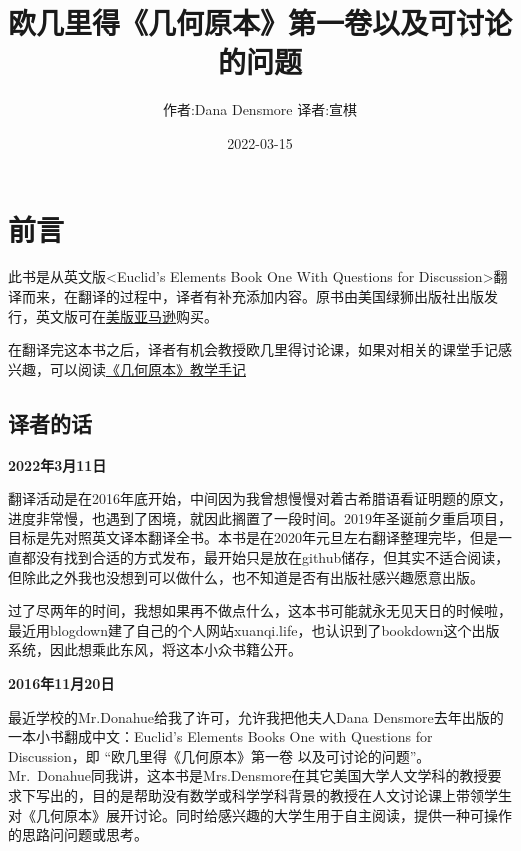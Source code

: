 \documentclass[
]{book}
\title{欧几里得《几何原本》第一卷以及可讨论的问题}
\author{作者:Dana Densmore 译者:宣棋}
\date{2022-03-15}
\begin{document}
\maketitle

{
\setcounter{tocdepth}{1}
\tableofcontents
}
\hypertarget{ux524dux8a00}{%
\chapter*{前言}\label{ux524dux8a00}}

此书是从英文版\textless Euclid's Elements Book One With Questions for Discussion\textgreater 翻译而来，在翻译的过程中，译者有补充添加内容。原书由美国绿狮出版社出版发行，英文版可在\href{https://www.amazon.com/Euclids-Elements-Book-Questions-Discussion/dp/1888009462/ref=sr_1_1?crid=23A0PAMQVA7S7\&keywords=Euclid’s+Elements+Book+One+With+Questions+for+Discussion\&qid=1647349755\&sprefix=euclid+s+elements+book+one+with+questions+for+discussion\%2Caps\%2C258\&sr=8-1}{美版亚马逊}购买。

在翻译完这本书之后，译者有机会教授欧几里得讨论课，如果对相关的课堂手记感兴趣，可以阅读\href{https://xunkeichiu.github.io/euclid_teaching/}{《几何原本》教学手记}

\hypertarget{ux8bd1ux8005ux7684ux8bdd}{%
\section*{译者的话}\label{ux8bd1ux8005ux7684ux8bdd}}

\textbf{2022年3月11日}

翻译活动是在2016年底开始，中间因为我曾想慢慢对着古希腊语看证明题的原文，进度非常慢，也遇到了困境，就因此搁置了一段时间。2019年圣诞前夕重启项目，目标是先对照英文译本翻译全书。本书是在2020年元旦左右翻译整理完毕，但是一直都没有找到合适的方式发布，最开始只是放在github储存，但其实不适合阅读，但除此之外我也没想到可以做什么，也不知道是否有出版社感兴趣愿意出版。

过了尽两年的时间，我想如果再不做点什么，这本书可能就永无见天日的时候啦，最近用blogdown建了自己的个人网站xuanqi.life，也认识到了bookdown这个出版系统，因此想乘此东风，将这本小众书籍公开。

\textbf{2016年11月20日}

最近学校的Mr.Donahue给我了许可，允许我把他夫人Dana Densmore去年出版的一本小书翻成中文：Euclid's Elements Books One with Questions for Discussion，即 ``欧几里得《几何原本》第一卷 以及可讨论的问题''。Mr.~Donahue同我讲，这本书是Mrs.Densmore在其它美国大学人文学科的教授要求下写出的，目的是帮助没有数学或科学学科背景的教授在人文讨论课上带领学生对《几何原本》展开讨论。同时给感兴趣的大学生用于自主阅读，提供一种可操作的思路问问题或思考。
\end{document}
